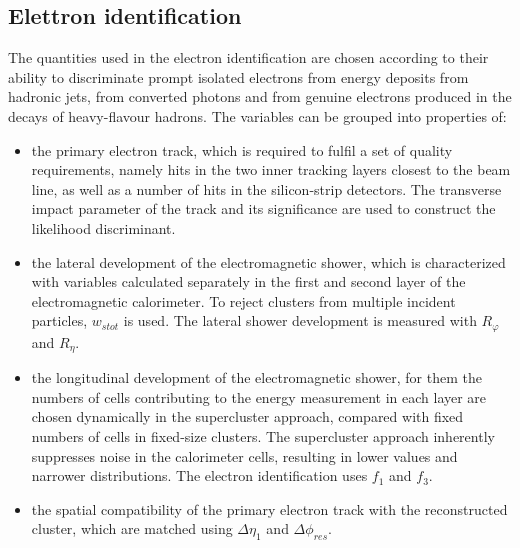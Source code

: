 \documentclass[a4paper, oneside]{book}
\begin{document}
			\subsection{Elettron identification}
			\cite{El ph reco}The quantities used in the electron identification are chosen according to their ability to discriminate prompt isolated electrons from energy deposits from hadronic jets, from converted photons and from genuine electrons produced in the decays of heavy-flavour hadrons. The variables can be
			grouped into properties of:
			\begin{itemize}
				\item the primary electron track, which is required to fulfil a set of quality requirements, namely hits in the two inner tracking layers closest to the beam line, as well as a number of hits in the silicon-strip detectors. The transverse impact parameter of the track and its significance are used to construct
				the likelihood discriminant.
				\item the lateral development of the electromagnetic shower, which is characterized with variables calculated separately in the first and second layer of the electromagnetic calorimeter. To reject clusters from multiple incident particles, $w_{s tot}$ is used. The lateral shower development is measured with $R_{\varphi}$ and $R_{\eta}$.
				\item the longitudinal development of the electromagnetic shower, for them the numbers of cells contributing to the energy
				measurement in each layer are chosen dynamically in the supercluster approach, compared with fixed numbers of cells in fixed-size clusters. The supercluster approach inherently suppresses noise in the calorimeter cells, resulting in lower values and narrower distributions. The electron
				identification uses $f_1$ and $f_3$.
				\item the spatial compatibility of the primary electron track with the reconstructed cluster, which are matched using $\Delta\eta_1$ and $\Delta\phi_{res}$. 
			\end{itemize}
\end{document}
